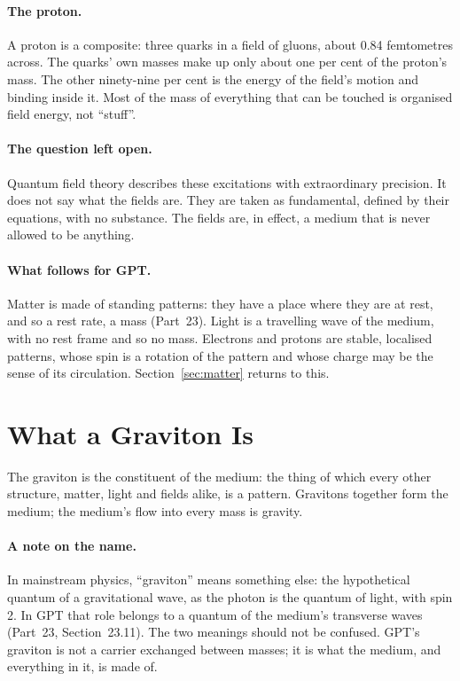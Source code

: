\documentclass[11pt,a4paper]{article}
\begin{document}
\paragraph{The proton.} A proton is a composite: three quarks in a field of gluons, about 0.84 femtometres across. The quarks' own masses make up only about one per cent of the proton's mass. The other ninety-nine per cent is the energy of the field's motion and binding inside it. Most of the mass of everything that can be touched is organised field energy, not ``stuff''.

\paragraph{The question left open.} Quantum field theory describes these excitations with extraordinary precision. It does not say what the fields are. They are taken as fundamental, defined by their equations, with no substance.  The fields are, in effect, a medium that is never allowed to be anything.

\paragraph{What follows for GPT.}  Matter is made of standing patterns: they have a place where they are at rest, and so a rest rate, a mass (Part~23). Light is a travelling wave of the medium, with no rest frame and so no mass. Electrons and protons are stable, localised patterns, whose spin is a rotation of the pattern and whose charge may be the sense of its circulation. Section~\ref{sec:matter} returns to this.

\section{What a Graviton Is}
\label{sec:graviton}

\begin{hypbar}
The graviton is the constituent of the medium: the thing of which every other structure, matter, light and fields alike, is a pattern. Gravitons together form the medium; the medium's flow into every mass is gravity.
\end{hypbar}

\paragraph{A note on the name.} In mainstream physics, ``graviton'' means something else: the hypothetical quantum of a gravitational wave, as the photon is the quantum of light, with spin 2. In GPT that role belongs to a quantum of the medium's transverse waves (Part~23, Section~23.11). The two meanings should not be confused. GPT's graviton is not a carrier exchanged between masses; it is what the medium, and everything in it, is made of.
\end{document}
